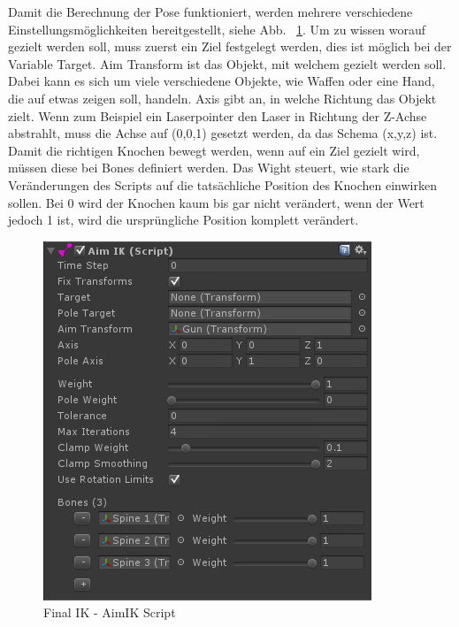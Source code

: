 \begin{itemize}
Damit die Berechnung der Pose funktioniert, werden mehrere verschiedene Einstellungsmöglichkeiten bereitgestellt, siehe Abb. ~\ref{fig:finalIK_aimIK_script}.
Um zu wissen worauf gezielt werden soll, muss zuerst ein Ziel festgelegt werden, dies ist möglich bei der Variable Target.
Aim Transform ist das Objekt, mit welchem gezielt werden soll.
Dabei kann es sich um viele verschiedene Objekte, wie Waffen oder eine Hand, die auf etwas zeigen soll, handeln.
Axis gibt an, in welche Richtung das Objekt zielt.
Wenn zum Beispiel ein Laserpointer den Laser in Richtung der Z-Achse abstrahlt, muss die Achse auf (0,0,1) gesetzt werden, da das Schema (x,y,z) ist.
Damit die richtigen Knochen bewegt werden, wenn auf ein Ziel gezielt wird, müssen diese bei Bones definiert werden.
Das Wight steuert, wie stark die Veränderungen des Scripts auf die tatsächliche Position des Knochen einwirken sollen.
Bei 0 wird der Knochen kaum bis gar nicht verändert, wenn der Wert jedoch 1 ist, wird die ursprüngliche Position komplett verändert.
\begin {figure}
    \centering
    \includegraphics[scale=0.7]{pics/finalik_aimik_script}
    \caption{Final IK - AimIK Script}
    \label{fig:finalIK_aimIK_script}
\end {figure}
~\cite{FinalIK_AimIK_2021}


\end{itemize}
